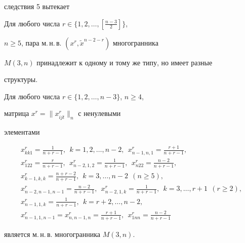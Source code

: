 следствия 5 вытекает





\begin{cor}


Для любого числа $r\in \{1,2,\dotsc,[\frac{n-3}{2}]\}$,


$n\geq 5$, пара м.\,н.\,в. $(x^r,\widetilde{x}^{n-2-r})$ многогранника


$M(3,n)$ принадлежит к одному и тому же типу, но имеет разные


структуры.


\end{cor}





\begin{thm}


Для любого числа $r\in \{1,2,\dotsc,n-3\}$, $n\geq 4$,


матрица $x^r=\|x^r_{ijt}\|_n$ с ненулевыми


элементами


\begin{gather*}


x^r_{kk1}=\frac{1}{n+r-1},\ \ k=1,2,\dotsc,n-2,


\ \ x^r_{n-1,n,1}=\frac{r+1}{n+r-1},\\


%


x^r_{122}=\frac{r}{n+r-1},\ \ x^r_{n-2,1,2}=\frac{1}{n+r-1},


\ \ x^r_{n22}=\frac{n-2}{n+r-1},\\


%


x^r_{k-1,k,k}=\frac{n+r-2}{n+r-1},\ \ k=3,\dotsc,n-2\ \ (n\geq 5),\\


%


x^r_{n-2,n-1,n-1}=\frac{n-2}{n+r-1},


\ \ x^r_{n-2,1,k}=\frac{1}{n+r-1},\ \ k=3,\dotsc,r+1\ \ (r\geq 2),\\


%


x^r_{n-1,1,k}=\frac{1}{n+r-1},\ \ k=r+2,\dotsc,n-2,\\


%


x^r_{n-1,1,n-1}=x^r_{n,n-1,n}=\frac{r+1}{n+r-1},


\ \ x^r_{1nn}=\frac{n-2}{n+r-1}


\end{gather*}


является м.\,н.\,в. многогранника $M(3,n)$.


\end{thm}





